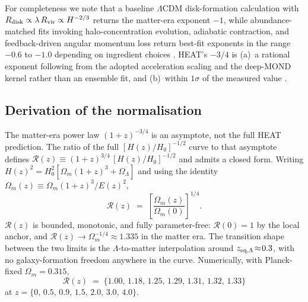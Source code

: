 \documentclass[twocolumn,letterpaper]{aastex631}
\newcommand{\lcdm}{\Lambda\mathrm{CDM}}
\begin{document}
For completeness we note that a baseline $\lcdm$ disk-formation
calculation with
$R_{\rm disk}\propto\lambda\,R_{\rm vir}\propto H^{-2/3}$
\citep{MoMaoWhite1998} returns the matter-era exponent $-1$,
while abundance-matched fits invoking halo-concentration
evolution, adiabatic contraction, and feedback-driven angular
momentum loss return best-fit exponents in the range
$-0.6$ to $-1.0$ depending on ingredient choices
\citep{Somerville2018}.  HEAT's $-3/4$ is (a)~a rational
exponent following from the adopted acceleration scaling and the
deep-MOND kernel rather than an ensemble fit, and (b)~within
$1\sigma$ of the measured value
\citep{vanderWel2014}.

\subsection{Derivation of the
  normalisation}\label{sec:norm}

The matter-era power law $(1+z)^{-3/4}$ is an asymptote, not the
full HEAT prediction.  The ratio of the full
$[H(z)/H_{0}]^{-1/2}$ curve to that asymptote defines
$\mathcal{R}(z)\equiv (1+z)^{3/4}\,[H(z)/H_{0}]^{-1/2}$ and
admits a closed form.  Writing
$H(z)^{2}=H_{0}^{2}[\Omega_{m}(1+z)^{3}+\Omega_{\Lambda}]$ and
using the identity
$\Omega_{m}(z)\equiv\Omega_{m}(1+z)^{3}/E(z)^{2}$,
\begin{equation}\label{eq:Rnorm2}
  \mathcal{R}(z)\;=\;
    \left[\frac{\Omega_{m}(z)}{\Omega_{m}(0)}\right]^{1/4}.
\end{equation}
$\mathcal{R}(z)$ is bounded, monotonic, and fully parameter-free:
$\mathcal{R}(0)=1$ by the local anchor, and
$\mathcal{R}(z)\to\Omega_{m}^{-1/4}\!\approx\!1.335$ in the
matter era.  The transition shape between the two limits is the
$\Lambda$-to-matter interpolation around
$z_{\rm eq,\Lambda}\!\approx\!0.3$, with no galaxy-formation
freedom anywhere in the curve.  Numerically, with Planck-fixed
$\Omega_m=0.315$,
\begin{equation*}
  \mathcal{R}(z)\;=\;
    \{1.00,\,1.18,\,1.25,\,1.29,\,1.31,\,1.32,\,1.33\}
\end{equation*}
at $z=\{0,\,0.5,\,0.9,\,1.5,\,2.0,\,3.0,\,4.0\}$.
\end{document}
